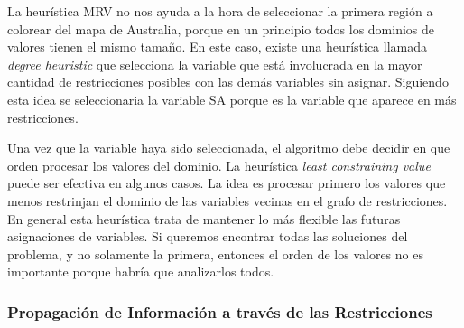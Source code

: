 La heur\'istica MRV no nos ayuda a la hora de seleccionar la primera regi\'on a colorear del mapa de Australia, porque en un principio todos los dominios de valores tienen el mismo tamaño. En este caso, existe una heur\'istica llamada \emph{degree heuristic} que selecciona la variable que est\'a involucrada en la mayor cantidad de restricciones posibles con las dem\'as variables sin asignar. Siguiendo esta idea se seleccionaria la variable SA porque es la variable que aparece en m\'as restricciones.

Una vez que la variable haya sido seleccionada, el algoritmo debe decidir en que orden procesar los valores del dominio. La heur\'istica \emph{least constraining value} puede ser efectiva en algunos casos. La idea es procesar primero los valores que menos restrinjan el dominio de las variables vecinas en el grafo de restricciones. En general esta heur\'istica trata de mantener lo m\'as flexible las futuras asignaciones de variables. Si queremos encontrar todas las soluciones del problema, y no solamente la primera, entonces el orden de los valores no es importante porque habr\'ia que analizarlos todos.

\subsubsection{Propagaci\'on de Informaci\'on a trav\'es de las Restricciones}



